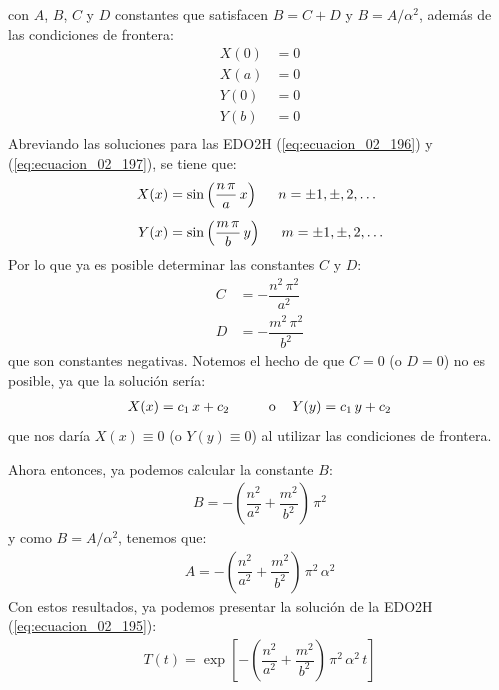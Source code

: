 con $A$, $B$, $C$ y $D$ constantes que satisfacen $B = C + D$ y $B = A / \alpha^{2}$, además de las condiciones de frontera:
\begin{align}
X(0) &= 0 \label{eq:ecuacion_02_198} \\[0.5em]
X(a) &= 0 \label{eq:ecuacion_02_199} \\[0.5em]
Y(0) &= 0 \label{eq:ecuacion_02_200} \\[0.5em]
Y(b) &= 0 \label{eq:ecuacion_02_201} \\[0.5em]
\end{align}
Abreviando las soluciones para las EDO2H (\ref{eq:ecuacion_02_196}) y (\ref{eq:ecuacion_02_197}), se tiene que:
\begin{align}
X(x) &= \sin \left( \dfrac{n \, \pi}{a} \, x \right) \hspace{0.5cm} n = \pm 1, \pm, 2, \ldots \label{eq:ecuacion_02_202} \\[0.5em]
Y(x) &= \sin \left( \dfrac{m \, \pi}{b} \, y \right) \hspace{0.5cm} m = \pm 1, \pm, 2, \ldots \label{eq:ecuacion_02_203}
\end{align}
Por lo que ya es posible determinar las constantes $C$ y $D$:
\begin{align*}
C &= - \dfrac{n^{2} \, \pi^{2}}{a^{2}} \\[0.5em]
D &= - \dfrac{m^{2} \, \pi^{2}}{b^{2}}
\end{align*}
que son constantes negativas. Notemos el hecho de que $C = 0$ (o $D = 0$) no es posible, ya que la solución sería:
\begin{align*}
X(x) = c_{1} \, x + c_{2} \hspace{1cm} \mbox{o } \hspace{0.3cm} Y(y) = c_{1} \, y + c_{2}
\end{align*}
que nos daría $X(x) \equiv 0$ (o $Y(y) \equiv 0$) al utilizar las condiciones de frontera.
\par
Ahora entonces, ya podemos calcular la constante $B$:
\begin{align*}
B = - \left( \dfrac{n^{2}}{a^{2}} + \dfrac{m^{2}}{b^{2}} \right) \, \pi^{2}
\end{align*}
y como $B = A / \alpha^{2}$, tenemos que:
\begin{align}
A = - \left( \dfrac{n^{2}}{a^{2}} + \dfrac{m^{2}}{b^{2}} \right) \, \pi^{2} \, \alpha^{2}
\label{eq:ecuacion_02_204}
\end{align}
Con estos resultados, ya podemos presentar la solución de la EDO2H (\ref{eq:ecuacion_02_195}):
\begin{align}
T(t) = \exp\left[ - \left( \dfrac{n^{2}}{a^{2}} + \dfrac{m^{2}}{b^{2}} \right) \, \pi^{2} \, \alpha^{2} \, t \right]
\label{eq:ecuacion_02_205}
\end{align}
